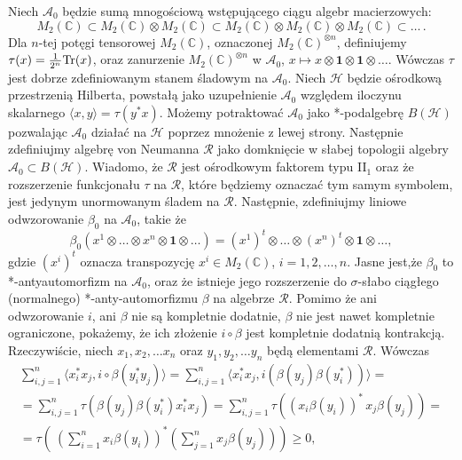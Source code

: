 Niech $\mathcal{A}_{0}$ będzie sumą mnogościową wstępującego ciągu algebr macierzowych:
\begin{equation}
M_{2}(\mathbb{C}) \subset
M_{2}(\mathbb{C}) \otimes M_{2}(\mathbb{C}) \subset
M_{2}(\mathbb{C}) \otimes M_{2}(\mathbb{C}) \otimes M_{2}(\mathbb{C}) \subset
\ldots\, .
\end{equation}
Dla $n$-tej potęgi tensorowej $M_{2}(\mathbb{C})$,
oznaczonej $M_{2}(\mathbb{C})^{\otimes n}$,
definiujemy $\tau(x) = \frac{1}{2^{n}} {\rm Tr}(x)$,
oraz zanurzenie
$M_{2}(\mathbb{C})^{\otimes n}$ w $\mathcal{A}_{0}$,
$x \mapsto x \otimes \mathbf{1} \otimes \mathbf{1} \otimes \ldots$.
Wówczas $\tau$ jest dobrze zdefiniowanym stanem śladowym na $\mathcal{A}_{0}$.
Niech $\mathcal{H}$ będzie ośrodkową przestrzenią Hilberta, powstałą jako uzupełnienie
$\mathcal{A}_{0}$ względem iloczynu skalarnego
$\langle x , y \rangle = \tau(y^{*} x )$.
Możemy potraktować $\mathcal{A}_{0}$ jako
\mbox{*-podalgebrę} $B(\mathcal{H})$
pozwalając $\mathcal{A}_{0}$ działać na $\mathcal{H}$ poprzez mnożenie z lewej strony.
Następnie zdefiniujmy algebrę von Neumanna 
$\mathcal{R}$ jako domknięcie w słabej topologii algebry
$\mathcal{A}_{0} \subset B(\mathcal{H})$.
Wiadomo, że 
$\mathcal{R}$ jest ośrodkowym faktorem typu II$\phantom{}_{1}$
oraz że rozszerzenie funkcjonału $\tau$ na $\mathcal{R}$,
które będziemy oznaczać tym samym symbolem,
jest jedynym unormowanym śladem na $\mathcal{R}$. 
Następnie, zdefiniujmy liniowe odwzorowanie
$\beta_{0}$ na $\mathcal{A}_{0}$, takie że
\begin{equation}
\beta_{0}(x^{1} \otimes \ldots\otimes x^{n} \otimes \mathbf{1} \otimes \ldots ) =
(x^{1})^{t} \otimes \ldots\otimes (x^{n})^{t} \otimes \mathbf{1} \otimes \ldots,
\end{equation}
gdzie $(x^{i})^{t}$ oznacza transpozycję $x^{i} \in M_{2}(\mathbb{C})$,
$i = 1,2,\ldots,n$.
Jasne jest,że $\beta_{0}$ to *-antyautomorfizm na $\mathcal{A}_{0}$,
oraz że istnieje jego rozszerzenie do $\sigma$-słabo ciągłego (normalnego)
*-anty-automorfizmu $\beta$ na algebrze $\mathcal{R}$.
Pomimo że ani odwzorowanie $i$, ani $\beta$ nie są kompletnie dodatnie,
$\beta$ nie jest nawet kompletnie ograniczone,
pokażemy, że ich złożenie $i \circ \beta$ jest kompletnie dodatnią kontrakcją.
Rzeczywiście, niech $x_{1}, x_{2}, \ldots x_{n}$ oraz
$y_{1}, y_{2}, \ldots y_{n}$ będą elementami $\mathcal{R}$.
Wówczas
\begin{multline}
\sum \limits_{i, j =1}^{n}
\langle x_{i}^{*} x_{j}, i \circ \beta(y_{i}^{*} y_{j}) \rangle =
\sum \limits_{i, j =1}^{n}
\langle x_{i}^{*} x_{j}, i ( \beta( y_{j}) \beta(y_{i}^{*})) \rangle = \\
=\sum \limits_{i, j =1}^{n}
\tau \left(\beta( y_{j}) \beta(y_{i}^{*}) x_{i}^{*} x_{j}\right) =
\sum \limits_{i, j =1}^{n} \tau \left( (x_{i} \beta(y_{i}) )^{*} \,  x_{j} \beta( y_{j})
\right) =\\
= \tau \left( \
\left( \sum \limits_{i=1}^{n} x_{i} \beta(y_{i}) \right)^{*}
\left( \sum \limits_{j=1}^{n} x_{j} \beta(y_{j}) \right)\right ) \geq 0,
\end{multline}
